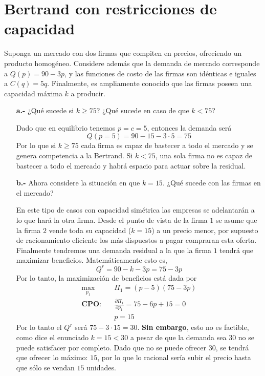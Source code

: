 \section{Bertrand con restricciones de capacidad}

Suponga un mercado con dos firmas que compiten en precios, ofreciendo un producto homogéneo. Considere además que la demanda de mercado corresponde a $Q(p) = 90 -3p$, y las funciones de costo de las firmas son idénticas e iguales a $C(q) = 5q$. Finalmente, es ampliamente conocido que las firmas poseen una capacidad máxima $k$ a producir.

\begin{itemize}
    \item [\textbf{a.-}] ¿Qué sucede si $k\geq 75$? ¿Qué sucede en caso de que $k<75$?
    \begin{solution}
        Dado que en equilibrio tenemos $p = c = 5$, entonces la demanda será 
        \begin{equation*}
            Q(p= 5) = 90-15 - 3\cdot 5 = 75
        \end{equation*}
        Por lo que si $k\geq 75$ cada firma es capaz de bastecer a todo el mercado y se genera competencia a la Bertrand. Si $k<75$, una sola firma no es capaz de bastecer a todo el mercado y habrá espacio para actuar sobre la residual.
    \end{solution}
    \item [\textbf{b.-}] Ahora considere la situación en que $k = 15$. ¿Qué sucede con las firmas en el mercado?
    \begin{solution}
        En este tipo de casos con capacidad simétrica las empresas se adelantarán a lo que hará la otra firma. Desde el punto de vista de la firma $1$ se asume que la firma $2$ vende toda su capacidad ($k =15$) a un precio menor, por supuesto de racionamiento eficiente los más dispuestos a pagar compraran esta oferta. Finalmente tendremos una demanda residual a la que la firma $1$ tendrá que maximizar beneficios. Matemáticamente esto es,  
        \begin{equation*}
            Q^r = 90-k-3p = 75-3p
        \end{equation*}
        Por lo tanto, la maximización de beneficios está dada por
        \begin{align*}
            \max_{p_1} \quad &\Pi_1 = (p-5)(75-3p) \\
            \textbf{CPO:}\quad &\frac{\partial \Pi_1}{\partial p_1} = 75 -6p +15 = 0 \\
            &p = 15
        \end{align*}
        Por lo tanto el $Q^r$ será $75-3\cdot 15 = 30$. \textbf{Sin embargo}, esto no es factible, como dice el enunciado $k=15<30$ a pesar de que la demanda sea $30$ no se puede satisfacer por completo. Dado que no se puede ofrecer $30$, se tendrá que ofrecer lo máximo: $15$, por lo que lo racional sería subir el precio hasta que sólo se vendan $15$ unidades.
        

\end{solution}
\end{itemize}
